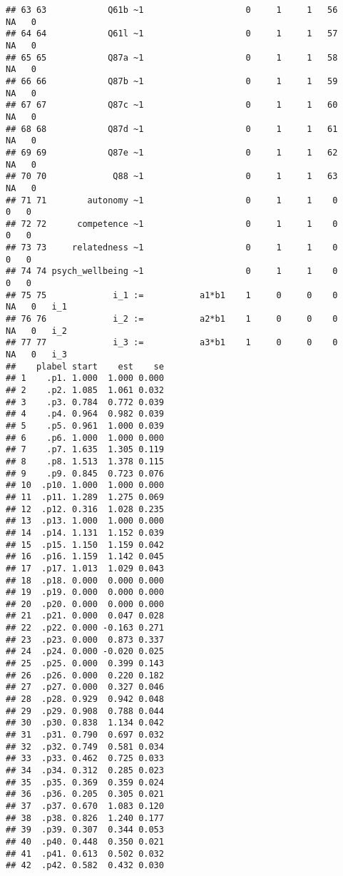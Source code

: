\documentclass[
]{article}
\begin{document}
\begin{verbatim}
## 63 63            Q61b ~1                    0     1     1   56     NA   0      
## 64 64            Q61l ~1                    0     1     1   57     NA   0      
## 65 65            Q87a ~1                    0     1     1   58     NA   0      
## 66 66            Q87b ~1                    0     1     1   59     NA   0      
## 67 67            Q87c ~1                    0     1     1   60     NA   0      
## 68 68            Q87d ~1                    0     1     1   61     NA   0      
## 69 69            Q87e ~1                    0     1     1   62     NA   0      
## 70 70             Q88 ~1                    0     1     1   63     NA   0      
## 71 71        autonomy ~1                    0     1     1    0      0   0      
## 72 72      competence ~1                    0     1     1    0      0   0      
## 73 73     relatedness ~1                    0     1     1    0      0   0      
## 74 74 psych_wellbeing ~1                    0     1     1    0      0   0      
## 75 75             i_1 :=           a1*b1    1     0     0    0     NA   0   i_1
## 76 76             i_2 :=           a2*b1    1     0     0    0     NA   0   i_2
## 77 77             i_3 :=           a3*b1    1     0     0    0     NA   0   i_3
##    plabel start    est    se
## 1    .p1. 1.000  1.000 0.000
## 2    .p2. 1.085  1.061 0.032
## 3    .p3. 0.784  0.772 0.039
## 4    .p4. 0.964  0.982 0.039
## 5    .p5. 0.961  1.000 0.039
## 6    .p6. 1.000  1.000 0.000
## 7    .p7. 1.635  1.305 0.119
## 8    .p8. 1.513  1.378 0.115
## 9    .p9. 0.845  0.723 0.076
## 10  .p10. 1.000  1.000 0.000
## 11  .p11. 1.289  1.275 0.069
## 12  .p12. 0.316  1.028 0.235
## 13  .p13. 1.000  1.000 0.000
## 14  .p14. 1.131  1.152 0.039
## 15  .p15. 1.150  1.159 0.042
## 16  .p16. 1.159  1.142 0.045
## 17  .p17. 1.013  1.029 0.043
## 18  .p18. 0.000  0.000 0.000
## 19  .p19. 0.000  0.000 0.000
## 20  .p20. 0.000  0.000 0.000
## 21  .p21. 0.000  0.047 0.028
## 22  .p22. 0.000 -0.163 0.271
## 23  .p23. 0.000  0.873 0.337
## 24  .p24. 0.000 -0.020 0.025
## 25  .p25. 0.000  0.399 0.143
## 26  .p26. 0.000  0.220 0.182
## 27  .p27. 0.000  0.327 0.046
## 28  .p28. 0.929  0.942 0.048
## 29  .p29. 0.908  0.788 0.044
## 30  .p30. 0.838  1.134 0.042
## 31  .p31. 0.790  0.697 0.032
## 32  .p32. 0.749  0.581 0.034
## 33  .p33. 0.462  0.725 0.033
## 34  .p34. 0.312  0.285 0.023
## 35  .p35. 0.369  0.359 0.024
## 36  .p36. 0.205  0.305 0.021
## 37  .p37. 0.670  1.083 0.120
## 38  .p38. 0.826  1.240 0.177
## 39  .p39. 0.307  0.344 0.053
## 40  .p40. 0.448  0.350 0.021
## 41  .p41. 0.613  0.502 0.032
## 42  .p42. 0.582  0.432 0.030

\end{verbatim}
\end{document}
